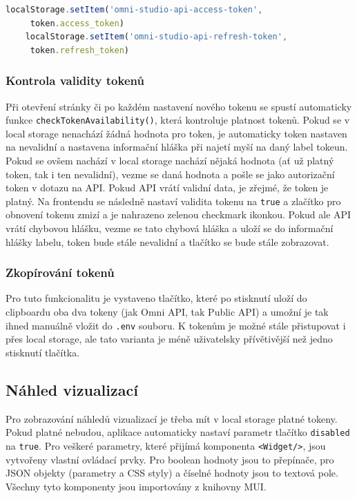\documentclass[czech, bc, kiv, he, iso690numb]{fasthesis}
\begin{document}
\begin{lstlisting}[language=Javascript, caption={Ukládání Omni API tokenů do local storage}, label=savingOmniToken]
	localStorage.setItem('omni-studio-api-access-token',
	 token.access_token)
	localStorage.setItem('omni-studio-api-refresh-token',
	 token.refresh_token)
\end{lstlisting}
	
\subsubsection{Kontrola validity tokenů}

Při otevření stránky či po každém nastavení nového tokenu se spustí automaticky funkce \texttt{checkTokenAvailability()}, která kontroluje platnost tokenů. Pokud se v local storage nenachází
žádná hodnota pro token, je automaticky token nastaven na nevalidní a nastavena informační hláška při najetí myší na daný label tokeun. Pokud se ovšem nachází v local storage nachází
nějaká hodnota (ať už platný token, tak i ten nevalidní), vezme se daná hodnota a pošle se jako autorizační token v dotazu na API. Pokud API vrátí validní data, je zřejmé, že token je platný.
Na frontendu se následně nastaví validita tokenu na \texttt{true} a zlačítko pro obnovení tokenu zmizí a je nahrazeno zelenou checkmark ikonkou. Pokud ale API vrátí chybovou hlášku, 
vezme se tato chybová hláška a uloží se do informační hlášky labelu, token bude stále nevalidní a tlačítko se bude stále zobrazovat. 

\subsubsection{Zkopírování tokenů}

Pro tuto funkcionalitu je vystaveno tlačítko, které po stisknutí uloží do clipboardu oba dva tokeny (jak Omni API, tak Public API) a umožní je tak ihned
manuálně vložit do \texttt{.env} souboru. K tokenům je možné stále přistupovat i přes local storage, ale tato varianta je méně uživatelsky přívětivější než jedno stisknutí tlačítka.



\subsection{Náhled vizualizací}
Pro zobrazování náhledů vizualizací je třeba mít v local storage platné tokeny. Pokud platné nebudou, aplikace automaticky nastaví parametr tlačítko
\texttt{disabled} na \texttt{true}. Pro veškeré parametry, které přijímá komponenta \texttt{<Widget/>}, jsou vytvořeny vlastní ovládací prvky.
Pro boolean hodnoty jsou to přepínače, pro JSON objekty (parametry a CSS styly) a číselné hodnoty jsou to textová pole. Všechny tyto komponenty
jsou importovány z knihovny MUI.
\end{document}
